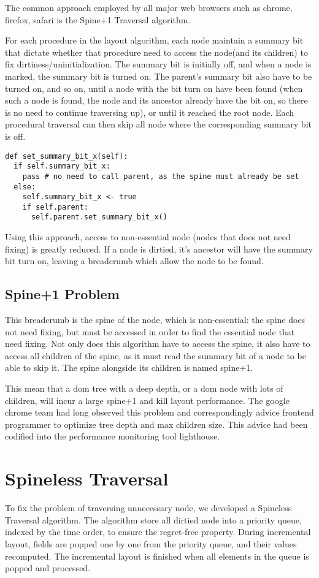 \documentclass[format=acmsmall, review=false, screen=true]{acmart}
\begin{document}
The common approach employed by all major web browsers such as chrome, firefox, safari is the Spine+1 Traversal algorithm.

For each procedure in the layout algorithm, each node maintain a summary bit that dictate whether that procedure need to access the node(and its children) to fix dirtiness/uninitialization. The summary bit is initially off, and when a node is marked, the summary bit is turned on. The parent's summary bit also have to be turned on, and so on, until a node with the bit turn on have been found (when such a node is found, the node and its ancestor already have the bit on, so there is no need to continue traversing up), or until it reached the root node.  Each procedural traversal can then skip all node where the corresponding summary bit is off.

\begin{verbatim}
def set_summary_bit_x(self):
  if self.summary_bit_x:
    pass # no need to call parent, as the spine must already be set
  else:
    self.summary_bit_x <- true
    if self.parent:
      self.parent.set_summary_bit_x()
\end{verbatim}

Using this approach, access to non-essential node (nodes that does not need fixing) is greatly reduced. If a node is dirtied, it's ancestor will have the summary bit turn on, leaving a breadcrumb which allow the node to be found.

\subsection{Spine+1 Problem}
This breadcrumb is the spine of the node, which is non-essential: the spine does not need fixing, but must be accessed in order to find the essential node that need fixing. Not only does this algorithm have to access the spine, it also have to access all children of the spine, as it must read the summary bit of a node to be able to skip it. The spine alongside its children is named spine+1.

This mean that a dom tree with a deep depth, or a dom node with lots of children, will incur a large spine+1 and kill layout performance. The google chrome team had long observed this problem and correspondingly advice frontend programmer to optimize tree depth and max children size. This advice had been codified into the performance monitoring tool lighthouse.

\section{Spineless Traversal}
To fix the problem of traversing unnecessary node, we developed a Spineless Traversal algorithm. The algorithm store all dirtied node into a priority queue, indexed by the time order, to ensure the regret-free property. During incremental layout, fields are popped one by one from the priority queue, and their values recomputed. The incremental layout is finished when all elements in the queue is popped and processed.
\end{document}
